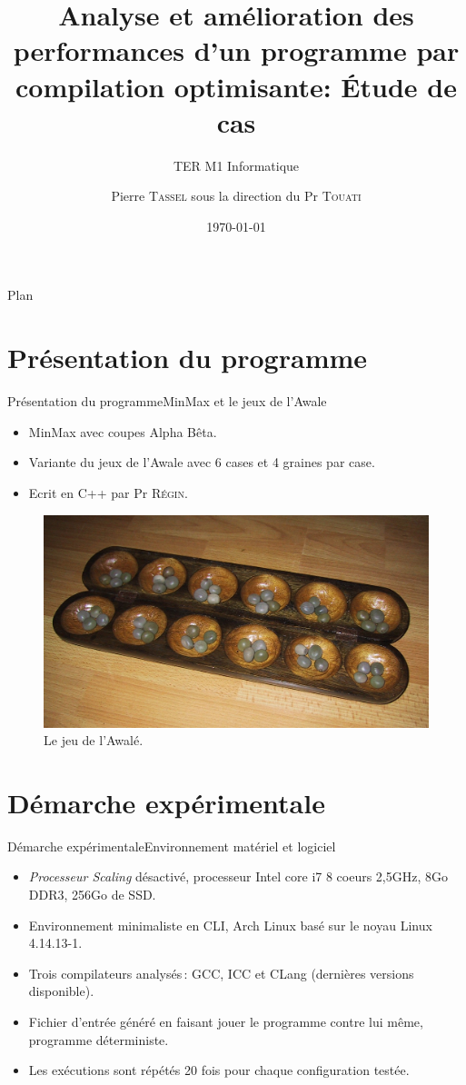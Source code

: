 \documentclass{beamer}
\title{Analyse et amélioration des performances d'un programme par compilation optimisante: Étude de cas}
\subtitle{TER M1 Informatique}
\author[Pierre \textsc{Tassel}]{Pierre \textsc{Tassel} sous la direction du Pr \textsc{Touati}}
\institute[Universitée Nice Sophia Antipolis] 
{Département Informatique\\
Universitée Nice Sophia Antipolis
\and
Master Informatique}
\date{\today}
\begin{document}
\begin{frame}
  \titlepage
\end{frame}

\begin{frame}{Plan}
  \tableofcontents
\end{frame}

\section{Présentation du programme}

\begin{frame}{Présentation du programme}{MinMax et le jeux de l'Awale}
\begin{itemize}
  \item
    MinMax avec coupes Alpha Bêta.
  \item
    Variante du jeux de l'Awale avec 6 cases et 4 graines par case.
  \item
    Ecrit en C++ par Pr \textsc{Régin}.
  \end{itemize}
  \begin{figure}
   \includegraphics[width= 0.7\linewidth, keepaspectratio]{Awale.jpg}
   \caption{Le jeu de l'Awalé.\label{Fig:awale}}
\end{figure}
\end{frame}

\section{Démarche expérimentale}
\begin{frame}{Démarche expérimentale}{Environnement matériel et logiciel}
\begin{itemize}
  \item
  	\textit{Processeur Scaling} désactivé, processeur Intel core i7 8 coeurs 2,5GHz, 8Go DDR3, 256Go de SSD.
  \item
    Environnement minimaliste en CLI, Arch Linux basé sur le noyau Linux 4.14.13-1.
    \item
    Trois compilateurs analysés\,: GCC, ICC et CLang (dernières versions disponible).
    \item
    Fichier d'entrée généré en faisant jouer le programme contre lui même, programme déterministe.
    \item
    Les exécutions sont répétés 20 fois pour chaque configuration testée.
\end{itemize}
\end{frame}
\end{document}
